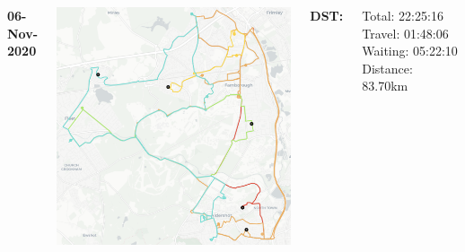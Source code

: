 \documentclass[usenames,dvipsnames]{beamer}
\begin{document}
\begin{frame}
\begin{columns}
\begin{minipage}[c][0.05\textheight][c]{\linewidth}
			\textbf{06-Nov-2020}
		\end{minipage}
		\begin{minipage}[c][0.7\textheight][c]{\linewidth}
			\centering
			\includegraphics[width=1\linewidth]{figures/06AldershotDST}
		\end{minipage}
		\begin{minipage}[c][0.2\textheight][c]{\linewidth}
			\scriptsize
			\hspace{17mm}\textbf{DST:}
			\begin{itemize}
				\setlength{\itemindent}{0.5in}
				\ditem Total: 22:25:16
				\ditem Travel: 01:48:06
				\ditem Waiting: 05:22:10
				\ditem Distance: 83.70km
			\end{itemize}
		\end{minipage}
	\end{columns}
\end{frame}
\end{document}
